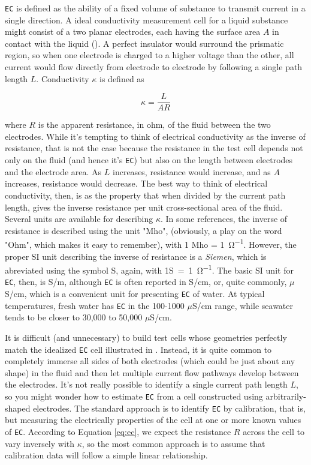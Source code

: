 \texttt{EC} is defined as the ability of a fixed volume of substance to transmit current in a single direction. A ideal conductivity measurement cell for a liquid substance might consist of a two planar electrodes, each having the surface area $A$ in contact with the liquid (). A perfect insulator would surround the prismatic region, so when one electrode is charged to a higher voltage than the other, all current would flow directly from electrode to electrode by following a single path length $L$.  Conductivity $\kappa$ is defined as 

\begin{equation}\label{eq:ec}
	\kappa= \frac{L}{AR}
\end{equation}

where $R$ is the apparent resistance, in \si{ohm}, of the fluid between the two electrodes. While it's tempting to think of electrical conductivity as the inverse of resistance, that is not the case because the resistance in the test cell depends not only on the fluid (and hence it's \texttt{EC}) but also on the length between electrodes and the electrode area.  As $L$ increases, resistance would increase, and as $A$ increases, resistance would decrease. The best way to think of electrical conductivity, then, is as the property that when divided by the current path length, gives the inverse resistance per unit cross-sectional area of the fluid.  Several units are available for describing $\kappa$. In some references, the inverse of resistance is described using the unit "Mho", (obviously, a play on the word "Ohm", which makes it easy to remember), with 1 Mho = \si{1 \ohm^{-1}}.  However, the proper SI unit describing the inverse of resistance is a \emph{Siemen}, which is abreviated using the symbol S, again, with \si{1S = 1 \ohm^{-1}}. The basic SI unit for \texttt{EC}, then, is S/m, although \texttt{EC} is often reported in S/cm, or, quite commonly, $\mu$S/cm, which is a convenient unit for presenting \texttt{EC} of water. At typical temperatures, fresh water has \texttt{EC} in the 100-1000 $\mu$S/cm range, while seawater tends to be closer to 30,000 to 50,000 $\mu$S/cm.

It is difficult (and unnecessary) to build test cells whose geometries perfectly match the idealized \texttt{EC} cell illustrated in . Instead, it is quite common to completely immerse all sides of both electrodes (which could be just about any shape) in the fluid and then let multiple current flow pathways develop between the electrodes. It's not really possible to identify a single current path length $L$, so you might wonder how to estimate \texttt{EC} from a cell constructed using arbitrarily-shaped electrodes. The standard approach is to identify \texttt{EC} by calibration, that is, but measuring the electrically properties of the cell at one or more known values of \texttt{EC}.  According to Equation \ref{eq:ec}, we expect the resistance $R$ across the cell to vary inversely with $\kappa$, so the most common approach is to assume that calibration data will follow a simple linear relationship. 

